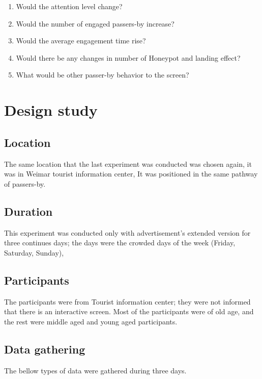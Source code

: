 \begin{enumerate}
\item Would the attention level change?
\item Would the number of engaged passers-by increase?
\item Would the average engagement time rise?
\item Would there be any changes in number of Honeypot and landing effect?
\item What would be other passer-by behavior to the screen?
\end{enumerate}



\section{Design study}

\subsection{Location}
The same location that the last experiment was conducted was chosen again, it was in Weimar tourist information center, It was positioned in the same pathway of passers-by. 


\subsection{Duration}
This experiment was conducted only with advertisement’s extended version for three continues days; the days were the crowded days of the week (Friday, Saturday, Sunday), 

\subsection{Participants}
The participants were from Tourist information center; they were not informed that there is an interactive screen. Most of the participants were of old age, and the rest were middle aged and young aged participants. 

\subsection{Data gathering}
The bellow types of data were gathered during three days.


